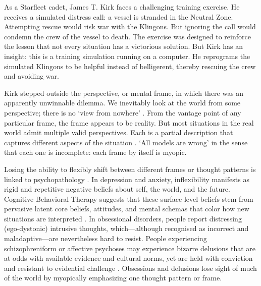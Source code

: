 \documentclass[11pt]{article}
\begin{document}

As a Starfleet cadet, James T. Kirk faces a challenging training exercise. He receives a simulated distress call: a vessel is stranded in the Neutral Zone. Attempting rescue would risk war with the Klingons. But ignoring the call would condemn the crew of the vessel to death. The exercise was designed to reinforce the lesson that not every situation has a victorious solution. But Kirk has an insight: this is a training simulation running on a computer. He reprograms the simulated Klingons to be helpful instead of belligerent, thereby rescuing the crew and avoiding war. 

Kirk stepped outside the perspective, or mental frame, in which there was an apparently unwinnable dilemma. We inevitably look at the world from some perspective; there is no `view from nowhere' \citep{nagel1986view}. From the vantage point of any particular frame, the frame appears to be reality. But most situations in the real world admit multiple valid perspectives. Each is a partial description that captures different aspects of the situation \citep{goffman1974frame, lakoff1980metaphors, javed2024big, goodman1978ways, feyerabend1975against}. `All models are wrong' \citep{box1976science} in the sense that each one is incomplete: each frame by itself is myopic.


Losing the ability to flexibly shift between different frames or thought patterns is linked to psychopathology \citep{kashdan2010psychological, reich1933character, shapiro1965neurotic}. In depression and anxiety, inflexibility manifests as rigid and repetitive negative beliefs about self, the world, and the future. Cognitive Behavioral Therapy suggests that these surface-level beliefs stem from pervasive latent core beliefs, attitudes, and mental schemas that color how new situations are interpreted \citep{beck2011cognitive}. In obsessional disorders, people report distressing (ego-dystonic) intrusive thoughts, which---although recognised as incorrect and maladaptive---are nevertheless hard to resist. People experiencing schizophreniform or affective psychoses may experience bizarre delusions that are at odds with available evidence and cultural norms, yet are held with conviction and resistant to evidential challenge \citep{mishara2010klaus, jaspers1997general, american2013diagnostic, heinz2019towards, adams2013computational}. Obsessions and delusions lose sight of much of the world by myopically emphasizing one thought pattern or frame.
\end{document}
